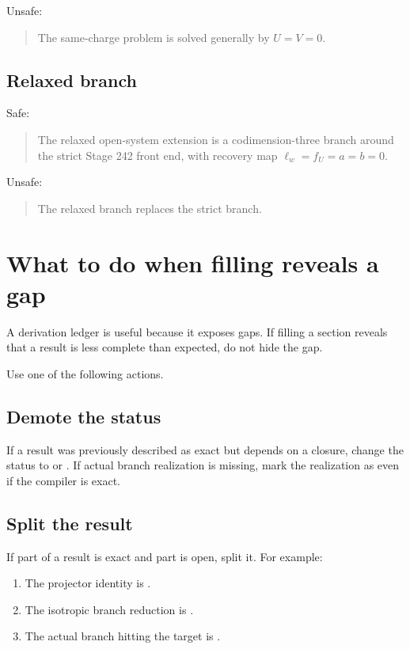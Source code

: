 Unsafe:
\begin{quote}
The same-charge problem is solved generally by \(U=V=0\).
\end{quote}

\subsection{Relaxed branch}
\label{subsec:safe-wording-relaxed-branch}

Safe:
\begin{quote}
The relaxed open-system extension is a codimension-three branch around the strict Stage 242 front end, with recovery map \(\ell_w=f_U=a=b=0\).
\end{quote}

Unsafe:
\begin{quote}
The relaxed branch replaces the strict branch.
\end{quote}

\section{What to do when filling reveals a gap}
\label{sec:what-to-do-with-gaps}

A derivation ledger is useful because it exposes gaps.  If filling a section reveals that a result is less complete than expected, do not hide the gap.

Use one of the following actions.

\subsection{Demote the status}
\label{subsec:demote-status}

If a result was previously described as exact but depends on a closure, change the status to \StatusExactClosure{} or \StatusReduced{}.  If actual branch realization is missing, mark the realization as \StatusOpen{} even if the compiler is exact.

\subsection{Split the result}
\label{subsec:split-result}

If part of a result is exact and part is open, split it.  For example:
\begin{enumerate}[leftmargin=2.2em]
  \item The projector identity is \StatusExact.
  \item The isotropic branch reduction is \StatusReduced.
  \item The actual branch hitting the target is \StatusOpen.
\end{enumerate}

